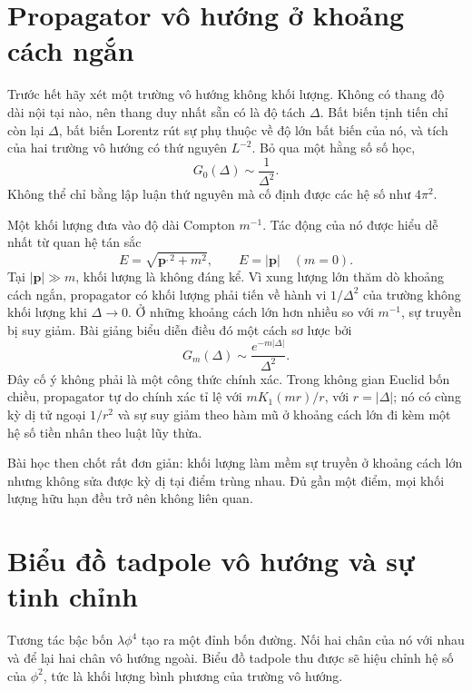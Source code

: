 \section{Propagator vô hướng ở khoảng cách ngắn}

Trước hết hãy xét một trường vô hướng không khối lượng. Không có thang độ dài nội tại nào, nên thang duy nhất sẵn có là độ tách \(\Delta\). Bất biến tịnh tiến chỉ còn lại \(\Delta\), bất biến Lorentz rút sự phụ thuộc về độ lớn bất biến của nó, và tích của hai trường vô hướng có thứ nguyên \(L^{-2}\). Bỏ qua một hằng số số học,
\begin{equation}
G_0(\Delta)\sim\frac{1}{\Delta^2}.
\end{equation}
Không thể chỉ bằng lập luận thứ nguyên mà cố định được các hệ số như \(4\pi^2\).

Một khối lượng đưa vào độ dài Compton \(m^{-1}\). Tác động của nó được hiểu dễ nhất từ quan hệ tán sắc
\begin{equation}
E=\sqrt{\bm p^{,2}+m^2},
\qquad
E=|\bm p|\quad(m=0).
\end{equation}
Tại \(|\bm p|\gg m\), khối lượng là không đáng kể. Vì xung lượng lớn thăm dò khoảng cách ngắn, propagator có khối lượng phải tiến về hành vi \(1/\Delta^2\) của trường không khối lượng khi \(\Delta\to0\). Ở những khoảng cách lớn hơn nhiều so với \(m^{-1}\), sự truyền bị suy giảm. Bài giảng biểu diễn điều đó một cách sơ lược bởi
\begin{equation}
G_m(\Delta)\sim \frac{e^{-m|\Delta|}}{\Delta^2}.
\end{equation}
Đây cố ý không phải là một công thức chính xác. Trong không gian Euclid bốn chiều, propagator tự do chính xác tỉ lệ với \(mK_1(mr)/r\), với \(r=|\Delta|\); nó có cùng kỳ dị tử ngoại \(1/r^2\) và sự suy giảm theo hàm mũ ở khoảng cách lớn đi kèm một hệ số tiền nhân theo luật lũy thừa.

Bài học then chốt rất đơn giản: khối lượng làm mềm sự truyền ở khoảng cách lớn nhưng không sửa được kỳ dị tại điểm trùng nhau. Đủ gần một điểm, mọi khối lượng hữu hạn đều trở nên không liên quan.

\section{Biểu đồ tadpole vô hướng và sự tinh chỉnh}

Tương tác bậc bốn \(\lambda\phi^4\) tạo ra một đỉnh bốn đường. Nối hai chân của nó với nhau và để lại hai chân vô hướng ngoài. Biểu đồ tadpole thu được sẽ hiệu chỉnh hệ số của \(\phi^2\), tức là khối lượng bình phương của trường vô hướng.

